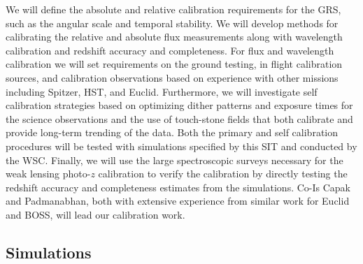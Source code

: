 We will define the absolute and relative calibration requirements for the GRS, such as the angular scale and temporal stability.
We will develop methods for calibrating the relative and absolute flux measurements along with wavelength calibration and redshift accuracy and completeness.
For flux and wavelength calibration we will set requirements on the ground testing, in flight calibration sources, and calibration observations based on experience
with other missions including Spitzer, HST, and Euclid.  Furthermore, we will investigate self calibration strategies based on optimizing dither patterns and exposure
times for the science observations and the use of touch-stone fields that both calibrate and provide long-term trending of the data.  Both the primary and
self calibration procedures will be tested with simulations specified by this SIT and conducted by the WSC.  Finally, we will use the large spectroscopic surveys
necessary for the weak lensing photo-$z$ calibration to verify the calibration by directly testing the redshift accuracy and completeness estimates from the simulations.
Co-Is Capak and
Padmanabhan, both with extensive experience from similar work for
Euclid and BOSS, will lead our calibration work.

\subsection{Simulations}
\label{sec:grs_simulations}




